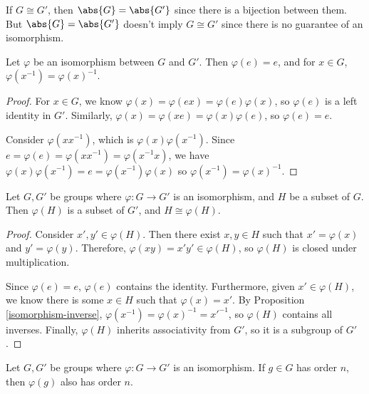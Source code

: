 \documentclass[12pt]{article}
\begin{document}
\begin{rmk}
    If $G \cong G'$, then $\abs{G} = \abs{G'}$ since there is a bijection between them. But $\abs{G} = \abs{G'}$ doesn't imply $G \cong G'$ since there is no guarantee of an isomorphism.
\end{rmk}

\begin{prop}\label{isomorphism-preserves-identity-inverses}
    Let $\varphi$ be an isomorphism between $G$ and $G'$. Then $\varphi(e) = e$, and for $x \in G$, $\varphi(x^{-1}) = \varphi(x)^{-1}$.
\end{prop}

\begin{proof}
    For $x \in G$, we know $\varphi(x) = \varphi(ex) = \varphi(e)\varphi(x)$, so $\varphi(e)$ is a left identity in $G'$. Similarly, $\varphi(x) = \varphi(xe) = \varphi(x)\varphi(e)$, so $\varphi(e) = e$.

    Consider $\varphi(xx^{-1})$, which is $\varphi(x)\varphi(x^{-1})$. Since $e = \varphi(e) = \varphi(xx^{-1}) = \varphi(x^{-1}x)$, we have $\varphi(x)\varphi(x^{-1}) = e = \varphi(x^{-1})\varphi(x)$ so $\varphi(x^{-1}) = \varphi(x)^{-1}$.
\end{proof}

\begin{prop}\label{isomorphism-subsets}
    Let $G, G'$ be groups where $\varphi: G \to G'$ is an isomorphism, and $H$ be a subset of $G$. Then $\varphi(H)$ is a subset of $G'$, and $H \cong \varphi(H)$.
\end{prop}

\begin{proof}
    Consider $x', y' \in \varphi(H)$. Then there exist $x, y \in H$ such that $x' = \varphi(x)$ and $y' = \varphi(y)$. Therefore, $\varphi(xy) = x'y' \in \varphi(H)$, so $\varphi(H)$ is closed under multiplication.

    Since $\varphi(e) = e$, $\varphi(e)$ contains the identity. Furthermore, given $x' \in \varphi(H)$, we know there is some $x \in H$ such that $\varphi(x) = x'$. By Proposition \ref{isomorphism-inverse}, $\varphi(x^{-1}) = \varphi(x)^{-1} = x'^{-1}$, so $\varphi(H)$ contains all inverses. Finally, $\varphi(H)$ inherits associativity from $G'$, so it is a subgroup of $G'$.
\end{proof}

\begin{prop}
    Let $G, G'$ be groups where $\varphi: G \to G'$ is an isomorphism. If $g \in G$ has order $n$, then $\varphi(g)$ also has order $n$.
\end{prop}
\end{document}
